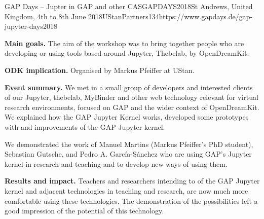 \begin{event}{GAP Days -- Jupter in GAP and other CAS}{GAPDAYS2018}{St Andrews, United Kingdom, 4th to 8th June 2018}{UStanPartners}{13}{4}{https://www.gapdays.de/gap-jupyter-days2018}

\textbf{Main goals.} The aim of the workshop was to bring together people who are developing or using tools based around Jupyter, Thebelab, by OpenDreamKit.

\textbf{ODK implication.} Organised by Markus Pfeiffer at UStan. 

\textbf{Event summary.} We met in a small group of developers and interested
clients of our Jupyter, thebelab, MyBinder and other web technology relevant for
virtual research environments, focused on GAP and the wider context of
OpenDreamKit. We explained how the GAP Jupyter Kernel works, developed some
prototypes with and improvements of the GAP Jupyter kernel.

We demonstrated the work of Manuel Martins (Markus Pfeiffer's PhD student),
Sebastian Gutsche, and Pedro A. García-Sánchez who are using GAP's Jupyter
kernel in research and teaching and to develop new ways of using them.

\textbf{Results and impact.} Teachers and researchers intending to of the GAP
Jupyter kernel and adjacent technologies in teaching and research, are now much
more comfortable using these technologies. The demonstration of the
possibilities left a good impression of the potential of this technology.

\end{event}
